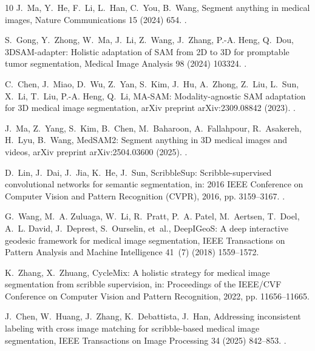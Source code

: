 \documentclass[preprint,12pt]{elsarticle}
\begin{document}
\begin{thebibliography}{10}
J.~Ma, Y.~He, F.~Li, L.~Han, C.~You, B.~Wang, Segment anything in medical
  images, Nature Communications 15 (2024) 654.
\newblock \href {https://doi.org/10.1038/s41467-024-44824-z}
  {}.

S.~Gong, Y.~Zhong, W.~Ma, J.~Li, Z.~Wang, J.~Zhang, P.-A. Heng, Q.~Dou,
  {3DSAM}-adapter: Holistic adaptation of {SAM} from {2D} to {3D} for
  promptable tumor segmentation, Medical Image Analysis 98 (2024) 103324.
\newblock \href {https://doi.org/10.1016/j.media.2024.103324}
  {}.

C.~Chen, J.~Miao, D.~Wu, Z.~Yan, S.~Kim, J.~Hu, A.~Zhong, Z.~Liu, L.~Sun,
  X.~Li, T.~Liu, P.-A. Heng, Q.~Li, {MA-SAM}: Modality-agnostic {SAM}
  adaptation for {3D} medical image segmentation, arXiv preprint
  arXiv:2309.08842 (2023).
\newblock \href {https://doi.org/10.48550/arXiv.2309.08842}
  {}.

J.~Ma, Z.~Yang, S.~Kim, B.~Chen, M.~Baharoon, A.~Fallahpour, R.~Asakereh,
  H.~Lyu, B.~Wang, {MedSAM2}: Segment anything in {3D} medical images and
  videos, arXiv preprint arXiv:2504.03600 (2025).
\newblock \href {https://doi.org/10.48550/arXiv.2504.03600}
  {}.

D.~Lin, J.~Dai, J.~Jia, K.~He, J.~Sun, {ScribbleSup}: Scribble-supervised
  convolutional networks for semantic segmentation, in: 2016 IEEE Conference on
  Computer Vision and Pattern Recognition (CVPR), 2016, pp. 3159--3167.
\newblock \href {https://doi.org/10.1109/CVPR.2016.344}
  {}.

G.~Wang, M.~A. Zuluaga, W.~Li, R.~Pratt, P.~A. Patel, M.~Aertsen, T.~Doel,
  A.~L. David, J.~Deprest, S.~Ourselin, et~al., {DeepIGeoS}: A deep interactive
  geodesic framework for medical image segmentation, IEEE Transactions on
  Pattern Analysis and Machine Intelligence 41~(7) (2018) 1559--1572.

K.~Zhang, X.~Zhuang, {CycleMix}: A holistic strategy for medical image
  segmentation from scribble supervision, in: Proceedings of the IEEE/CVF
  Conference on Computer Vision and Pattern Recognition, 2022, pp.
  11656--11665.

J.~Chen, W.~Huang, J.~Zhang, K.~Debattista, J.~Han, Addressing inconsistent
  labeling with cross image matching for scribble-based medical image
  segmentation, IEEE Transactions on Image Processing 34 (2025) 842--853.
\newblock \href {https://doi.org/10.1109/TIP.2025.3530787}
  {}.


\end{thebibliography}
\end{document}
